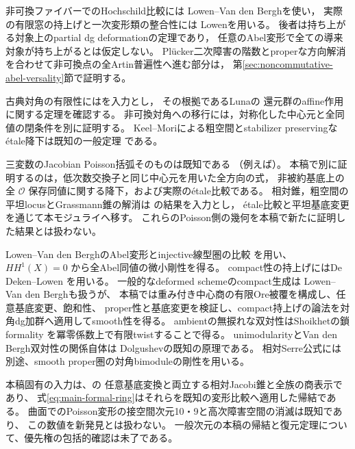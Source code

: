 \documentclass[a4paper,11pt]{ltjsarticle}
\numberwithin{equation}{section}
\theoremstyle{plain}
\theoremstyle{definition}
\theoremstyle{remark}
\begin{document}
非可換ファイバーでのHochschild比較には
Lowen--Van den Bergh\cite[Theorem~4.1.3, Theorem~6.1, Corollary~6.8]{LowenVdBHochschild}を使い，
実際の有限窓の持上げと一次変形類の整合性には
Lowen\cite[Theorems~3.22, 4.18, Remark~4.20]{LowenCharacteristic2008}を用いる。
後者は持ち上がる対象上のpartial dg deformationの定理であり，
任意のAbel変形で全ての導来対象が持ち上がるとは仮定しない。
Pl\"ucker二次障害の階数とproperな方向解消を合わせて非可換点の全Artin普遍性へ進む部分は，
第\ref{sec:noncommutative-abel-versality}節で証明する。

古典対角の有限性には\cite[定理9.2]{PoissonDP}を入力とし，
その根拠であるLuna\cite[I, \S4, Corollaire, p.~90]{Luna1973}の
還元群のaffine作用に関する定理を確認する。
非可換対角への移行には，対称化した中心元と全同値の閉条件を別に証明する。
Keel--Moriによる粗空間とstabilizer preservingな\'{e}tale降下は既知の一般定理
\cite[Tags 0DUT, 0DUS, 0DUE]{StacksProject}である。

三変数のJacobian Poisson括弧そのものは既知である
（例えば\cite[Introduction, 式(3)]{Pichereau2006}）。
本稿で別に証明するのは，低次数交換子と同じ中心元を用いた全方向の式，
非被約基底上の全 $\mathcal O$ 保存同値に関する降下，および実際の\'{e}tale比較である。
相対錐，粗空間の平坦locusとGrassmann錐の解消は
\cite[定理7.3, 9.6, 10.3, 命題10.4]{PoissonDP}の結果を入力とし，
\'{e}tale比較と平坦基底変更を通じて本モジュライへ移す。
これらのPoisson側の幾何を本稿で新たに証明した結果とは扱わない。


Lowen--Van den BerghのAbel変形とinjective線型圏の比較
\cite[Theorem~8.17, Appendix~B]{LowenVdBDeformation}を用い、
$HH^1(X)=0$ から全Abel同値の微小剛性を得る。
compact性の持上げにはDe Deken--Lowen
\cite[Propositions~5.8--5.9]{DDL2011}を用いる。
一般的なdeformed schemeのcompact生成は
Lowen--Van den Bergh\cite[Proposition~5.1]{LowenVdBCompact2013}も扱うが、
本稿では重み付き中心商の有限Ore被覆を構成し、任意基底変更、飽和性、
proper性と基底変更を検証し、compact持上げの論法を対角dg加群へ適用してsmooth性を得る。
ambientの無捩れな双対性はShoikhetの鎖formality
\cite[Theorem~2.2.7]{Shoikhet2003}を冪零係数上で有限twistすることで得る。
unimodularityとVan den Bergh双対性の関係自体は
Dolgushev\cite[Theorem~3]{DolgushevModular2009}の既知の原理である。
相対Serre公式には別途、smooth proper圏の対角bimoduleの剛性を用いる。

本稿固有の入力は、\cite[定理7.3, 定理8.8]{PoissonDP}の
任意基底変換と両立する相対Jacobi錐と全族の商表示であり、
式\eqref{eq:main-formal-ring}はそれらを既知の変形比較へ適用した帰結である。
曲面でのPoisson変形の接空間次元10・9と高次障害空間の消滅は既知\cite[Theorem 3.9]{HongXu2011}であり、
この数値を新発見とは扱わない。
一般次元の本稿の帰結と復元定理について、優先権の包括的確認は未了である。
\end{document}
